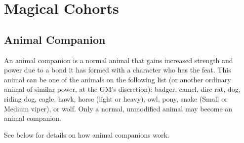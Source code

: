 
\section{Magical Cohorts}
\subsection{Animal Companion}
\label{sec:AnimalCompanion}
An animal companion is a normal animal that gains increased strength and power due to a bond it has formed with a character
who has the  feat. 
This animal can be one of the animals on the following list (or another ordinary animal of similar power, at the GM's discretion):
badger, camel, dire rat, dog, riding dog, eagle, hawk, horse (light or heavy), owl, pony, snake (Small or Medium viper), or wolf.
Only a normal, unmodified animal may become an animal companion.

See below for details on how animal companions work.
